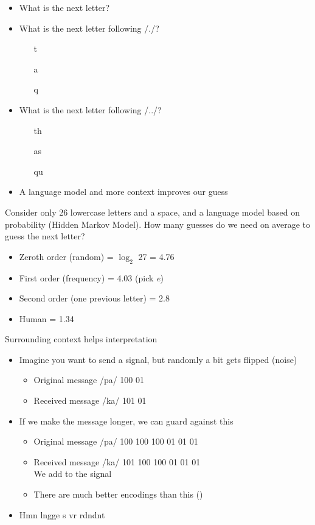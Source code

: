 \documentclass[a4paper,landscape,headrule,footrule,xetex]{foils}
\begin{document}
\begin{itemize}
\item What is the next letter?
\item What is the next letter following /./?
  \begin{itemize}
  \item [t]
  \item [a]
  \item [q]
  \end{itemize}
\item What is the next letter following /../?
  \begin{itemize}
  \item [th]
  \item [as]
  \item [qu]
  \end{itemize}
\item A language model and more context improves our guess
\end{itemize}



Consider only 26 lowercase letters and a space, and a language model
based on probability (Hidden Markov Model).  How many guesses do we
need on average to guess the next letter?

\begin{itemize}
\item Zeroth order (random) = $\log_2$ 27 = 4.76
\item First order (frequency) = 4.03 \hfill (pick \textit{e})
\item Second order (one previous letter) = 2.8
\item Human = 1.34
\end{itemize}

Surrounding context helps interpretation



\begin{itemize}
\item Imagine you want to send a signal, but randomly a bit gets flipped (noise)
  \begin{itemize}
  \item Original message /pa/ 100 01
  \item Received message /ka/ 101 01
  \end{itemize}
\item If we make the message longer, we can guard against this
  \begin{itemize}
  \item Original message /pa/ 100 100 100 01 01 01
  \item Received message /ka/ 101 100 100 01 01 01
\\   We add  to the signal
\item There are much better encodings than this ()
\end{itemize}
\item Hmn lngge s vr rdndnt 
\end{itemize}
\end{document}
